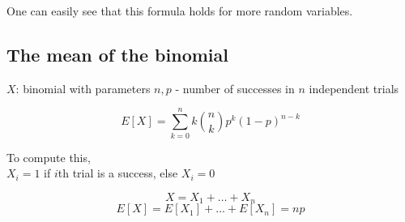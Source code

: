 \documentclass{article}
\begin{document}
One can easily see that this formula holds for more random variables.

\subsection*{The mean of the binomial}
\(X\): binomial with parameters \(n,p\) 
 - number of successes in \(n\) independent trials

\[
E[X] = \sum_{k=0}^{n} k \binom{n}{k} p^k (1-p)^{n-k}
\]

To compute this, \\
\(X_i = 1\) if \(i\)th trial is a success, else \(X_i = 0\)

\[
X = X_1 + \dots + X_n
\]
\[
E[X] = E[X_1] + \dots + E[X_n] = np
\]
\end{document}
